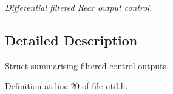 \begin{DoxyCompactItemize}
\begin{DoxyCompactList}\small\item\em Differential filtered Rear output control. \end{DoxyCompactList}\end{DoxyCompactItemize}


\subsection{Detailed Description}
Struct summarising filtered control outputs. 

Definition at line 20 of file util.\+h.

